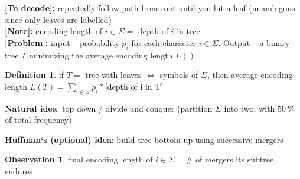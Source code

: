 \documentclass[a4paper,12pt]{article}
\theoremstyle{plain}
\theoremstyle{definition}
\newtheorem*{observation}{Observation}
\newtheorem*{definition}{Definition}
\theoremstyle{remark}
\begin{document}
\textbf{[To decode]:} repeatedly follow path from root until you hit a leaf (unambigous since only leaves are labelled)
\\

\textbf{[Note]:} encoding length of $i \in \Sigma =$ depth of $i$ in tree
\\

\textbf{[Problem]:} input -- probability $p_i$ for each character $i \in \Sigma$. Output -- a binary tree $T$ minimizing the average encoding length $L()$

\begin{definition}if $T =$ tree with leaves $\iff$ symbols of $\Sigma$, then average encoding length $L(T) = \sum\limits_{i \in \Sigma} p_i*$[depth of i in T]\end{definition}

\textbf{Natural idea}: top down / divide and conquer (partition $\Sigma$ into two, with $50~\%$ of total frequency)

\textbf{Huffman`s (optional) idea}: build tree \underline{bottom-up} using successive mergers

\begin{observation}final encoding length of $i \in \Sigma = \#$ of mergers its subtree endures\end{observation}
\end{document}

